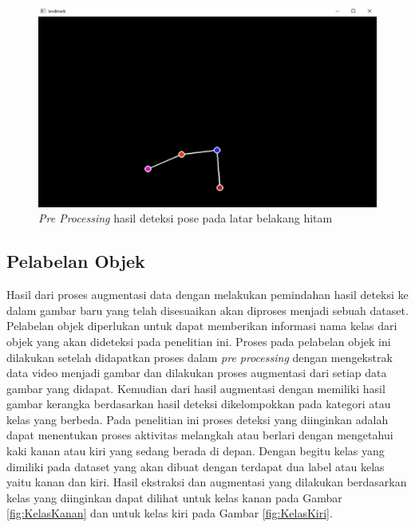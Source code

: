 \begin{figure}[H]
  \centering
  \includegraphics[scale=0.8]{gambar/deteksi pose3.png}
  \caption{\emph{Pre Processing} hasil deteksi pose pada latar belakang hitam}
  \label{fig:PreProcessing2}
\end{figure}

\subsection{Pelabelan Objek}
\label{subsec:PelabelanObjek}

Hasil dari proses augmentasi data dengan melakukan pemindahan hasil deteksi ke dalam gambar baru yang telah disesuaikan akan diproses menjadi sebuah dataset. Pelabelan objek diperlukan untuk dapat memberikan informasi nama kelas dari objek yang akan dideteksi pada penelitian ini. Proses pada pelabelan objek ini dilakukan setelah didapatkan proses dalam \emph{pre processing} dengan mengekstrak data video menjadi gambar dan dilakukan proses augmentasi dari setiap data gambar yang didapat. Kemudian dari hasil augmentasi dengan memiliki hasil gambar kerangka berdasarkan hasil deteksi dikelompokkan pada kategori atau kelas yang berbeda. Pada penelitian ini proses deteksi yang diinginkan adalah dapat menentukan proses aktivitas melangkah atau berlari dengan mengetahui kaki kanan atau kiri yang sedang berada di depan. Dengan begitu kelas yang dimiliki pada dataset yang akan dibuat dengan terdapat dua label atau kelas yaitu kanan dan kiri. Hasil ekstraksi dan augmentasi yang dilakukan berdasarkan kelas yang diinginkan dapat dilihat untuk kelas kanan pada Gambar \ref{fig:KelasKanan} dan untuk kelas kiri pada Gambar \ref{fig:KelasKiri}.

